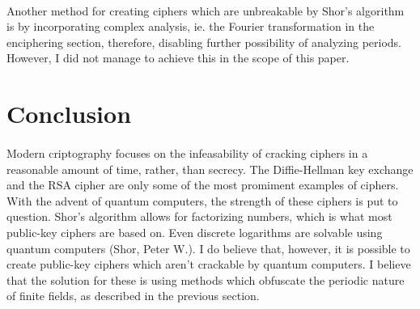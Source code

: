 \documentclass[a4paper, 10pt]{article}
\begin{document}
\paragraph*{}
Another method for creating ciphers which are unbreakable by Shor's algorithm is by incorporating complex analysis, ie.
 the Fourier transformation in the enciphering section, therefore, disabling further possibility of analyzing periods. 
However, I did not manage to achieve this in the scope of this paper.

\section{Conclusion}
\paragraph*{}
Modern criptography focuses on the infeasability of cracking ciphers in a reasonable amount of time, rather, than 
secrecy. The Diffie-Hellman key exchange and the RSA cipher are only some of the most promiment examples of ciphers.
With the advent of quantum computers, the strength of these ciphers is put to question. Shor's algorithm allows for 
factorizing numbers, which is what most public-key ciphers are based on. Even discrete logarithms are solvable using 
quantum computers (Shor, Peter W.). I do believe that, however, it is possible to create public-key ciphers which 
aren't crackable by quantum computers. I believe that the solution for these is using methods which obfuscate the 
periodic nature of finite fields, as described in the previous section.

\pagebreak
\end{document}
